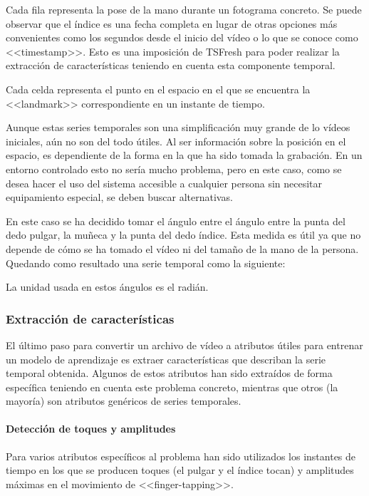 Cada fila representa la pose de la mano durante un fotograma concreto. Se puede
observar que el índice es una fecha completa en lugar de otras opciones más
convenientes como los segundos desde el inicio del vídeo o lo que se conoce como
<<timestamp>>. Esto es una imposición de TSFresh para poder realizar la
extracción de características teniendo en cuenta esta componente temporal.

Cada celda representa el punto en el espacio en el que se encuentra la
<<landmark>> correspondiente en un instante de tiempo.

Aunque estas series temporales son una simplificación muy grande de lo vídeos
iniciales, aún no son del todo útiles. Al ser información sobre la posición en
el espacio, es dependiente de la forma en la que ha sido tomada la grabación. En
un entorno controlado esto no sería mucho problema, pero en este caso, como se
desea hacer el uso del sistema accesible a cualquier persona sin necesitar
equipamiento especial, se deben buscar alternativas.

En este caso se ha decidido tomar el ángulo entre el ángulo entre la punta del
dedo pulgar, la muñeca y la punta del dedo índice. Esta medida es útil ya que no
depende de cómo se ha tomado el vídeo ni del tamaño de la mano de la persona.
Quedando como resultado una serie temporal como la siguiente:


La unidad usada en estos ángulos es el radián.

\subsubsection{Extracción de características}

El último paso para convertir un archivo de vídeo a atributos útiles para
entrenar un modelo de aprendizaje es extraer características que describan la
serie temporal obtenida. Algunos de estos atributos han sido extraídos de forma
específica teniendo en cuenta este problema concreto, mientras que otros (la
mayoría) son atributos genéricos de series temporales.

\paragraph{Detección de toques y amplitudes}

Para varios atributos específicos al problema han sido utilizados los instantes
de tiempo en los que se producen toques (el pulgar y el índice tocan) y
amplitudes máximas en el movimiento de <<finger-tapping>>.

